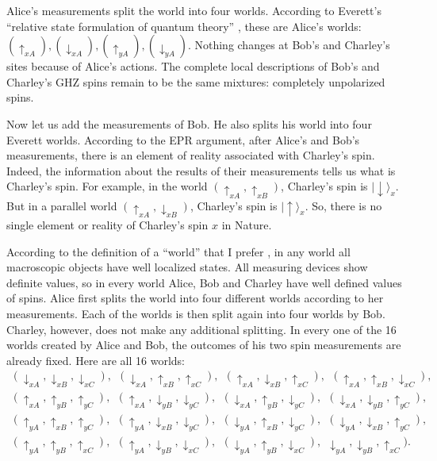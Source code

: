 \documentclass[12pt]{article}
\begin{document}
Alice's measurements split the world into four worlds. According to Everett's ``relative state formulation of quantum theory'' \cite{Eve}, these  are   Alice's worlds: $(\uparrow_{xA}),(\downarrow_{xA}),(\uparrow_{yA}),(\downarrow_{yA})$.   Nothing changes at Bob's and Charley's sites because of Alice's actions. The complete local descriptions of Bob's and Charley's GHZ spins remain to be  the same mixtures: completely unpolarized spins.

Now let us add the measurements of Bob. He also splits his world  into four Everett worlds. According to the EPR argument, after Alice's  and Bob's measurements, there is an element of reality associated with Charley's spin. Indeed, the information about the results of  their measurements tells us what is Charley's spin. For example, in the  world  $(\uparrow_{xA}, \uparrow_{xB})$,  Charley's spin is $|{\downarrow}\rangle_x$. But in a parallel world $(\uparrow_{xA}, \downarrow_{xB})$,  Charley's spin is $|{\uparrow}\rangle_x$. So, there is no single element or reality of Charley's spin $x$ in Nature.

 According to the definition of a ``world'' that I prefer \cite{SEP}, in any world all macroscopic objects  have well localized states.  All measuring devices show definite values, so in every world Alice, Bob and Charley have well defined values of spins. Alice first splits the world into four different worlds according to her measurements. Each of the worlds is then split again into four worlds by Bob. Charley, however, does not make any additional splitting. In every one of the 16 worlds created by Alice and Bob, the outcomes of his two spin measurements are already fixed. Here are all 16 worlds:
 \begin{eqnarray}
\nonumber
 (\downarrow_{xA}, \downarrow_{xB}, \downarrow_{xC}),~~(\downarrow_{xA}, \uparrow_{xB}, \uparrow_{xC}),~~(\uparrow_{xA}, \downarrow_{xB}, \uparrow_{xC}),~~(\uparrow_{xA}, \uparrow_{xB}, \downarrow_{xC}),~~ \\ \nonumber
 (\uparrow_{xA}, \uparrow_{yB}, \uparrow_{yC}),~~(\uparrow_{xA}, \downarrow_{yB}, \downarrow_{yC}),~~(\downarrow_{xA}, \uparrow_{yB}, \downarrow_{yC}),~~(\downarrow_{xA}, \downarrow_{yB}, \uparrow_{yC}),~~ \\
 (\uparrow_{yA}, \uparrow_{xB}, \uparrow_{yC}),~~(\uparrow_{yA}, \downarrow_{xB}, \downarrow_{yC}),~~(\downarrow_{yA}, \uparrow_{xB}, \downarrow_{yC}),~~(\downarrow_{yA}, \downarrow_{xB}, \uparrow_{yC}),~~ \\\nonumber
 (\uparrow_{yA}, \uparrow_{yB}, \uparrow_{xC}),~~(\uparrow_{yA}, \downarrow_{yB}, \downarrow_{xC}),~~(\downarrow_{yA}, \uparrow_{yB}, \downarrow_{xC}),~~\downarrow_{yA}, \downarrow_{yB}, \uparrow_{xC}).~~
  \end{eqnarray}
\end{document}
